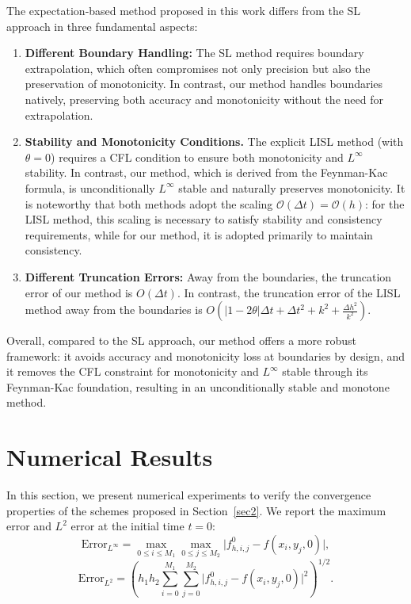 \documentclass[11pt]{article}
\theoremstyle{mythm}
\theoremstyle{definition}
\begin{document}
	
	The expectation‑based method proposed in this work differs from the SL approach in three fundamental aspects:
	\begin{enumerate}
		\item \textbf{Different Boundary Handling:} The SL method requires boundary extrapolation, which often compromises not only precision but also the preservation of monotonicity. In contrast, our method handles boundaries natively, preserving both accuracy and monotonicity without the need for extrapolation.
		
		\item \textbf{Stability and Monotonicity Conditions.} The explicit LISL method (with $\theta=0$) requires a CFL condition to ensure both monotonicity and $L^{\infty}$ stability. In contrast, our method, which is derived from the Feynman-Kac formula, is unconditionally $L^{\infty}$ stable and naturally preserves monotonicity. It is noteworthy that both methods adopt the scaling $\mathcal{O}(\Delta t) = \mathcal{O}(h)$: for the LISL method, this scaling is necessary to satisfy stability and consistency requirements, while for our method, it is adopted primarily to maintain consistency.
		
		\item \textbf{Different Truncation Errors:} Away from the boundaries, the truncation error of our method is $O(\Delta t)$. In contrast, the truncation error of the LISL method away from the boundaries is $O\left( |1 - 2\theta|\Delta t + \Delta t^2 + k^2 + \frac{\Delta h^2}{k^2} \right)$.
	\end{enumerate}
	
	
	Overall, compared to the SL approach, our method offers a more robust framework:
	it avoids accuracy and monotonicity loss at boundaries by design, and it removes the
	CFL constraint for monotonicity and $L^{\infty}$ stable through its Feynman-Kac foundation, resulting in
	an unconditionally stable and monotone method.
	\section{Numerical Results}
	\label{sec4}
	In this section, we present numerical experiments to verify the convergence properties of the schemes proposed in Section~\ref{sec2}. We report the maximum error and $L^2$  error at the initial time $t=0$:
	\[
	\text{Error}_{L^\infty}
	= \max_{0\le i\le M_1}\max_{0\le j\le M_2} 
	\big| f_{h,i,j}^0 - f(x_i,y_j,0) \big|,
	\]
	\[
	\text{Error}_{L^2}
	= \left( h_1 h_2 \sum_{i=0}^{M_1}\sum_{j=0}^{M_2}
	\big| f_{h,i,j}^{0} - f(x_i,y_j,0) \big|^2 \right)^{1/2}.
	\]
	
\end{document}
